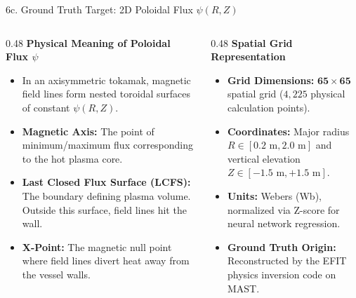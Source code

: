 \documentclass[aspectratio=169, 10pt]{beamer}
\begin{document}
\begin{frame}{6c. Ground Truth Target: 2D Poloidal Flux $\psi(R, Z)$}
  \begin{columns}[T]
    \begin{column}{0.48\textwidth}
      \textbf{\color{NavyBlue} Physical Meaning of Poloidal Flux $\psi$}
      \begin{itemize}
        \item In an axisymmetric tokamak, magnetic field lines form nested toroidal surfaces of constant $\psi(R, Z)$.
        \item \textbf{Magnetic Axis:} The point of minimum/maximum flux corresponding to the hot plasma core.
        \item \textbf{Last Closed Flux Surface (LCFS):} The boundary defining plasma volume. Outside this surface, field lines hit the wall.
        \item \textbf{X-Point:} The magnetic null point where field lines divert heat away from the vessel walls.
      \end{itemize}
    \end{column}

    \begin{column}{0.48\textwidth}
      \textbf{\color{NavyBlue} Spatial Grid Representation}
      \begin{itemize}
        \item \textbf{Grid Dimensions:} $\mathbf{65 \times 65}$ spatial grid ($4,225$ physical calculation points).
        \item \textbf{Coordinates:} Major radius $R \in [0.2\text{ m}, 2.0\text{ m}]$ and vertical elevation $Z \in [-1.5\text{ m}, +1.5\text{ m}]$.
        \item \textbf{Units:} Webers (Wb), normalized via Z-score for neural network regression.
        \item \textbf{Ground Truth Origin:} Reconstructed by the EFIT physics inversion code on MAST.
      \end{itemize}
    \end{column}
  \end{columns}
\end{frame}
\end{document}
